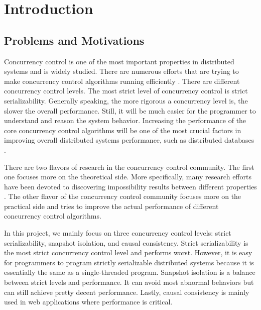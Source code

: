 \newcommand{\package}{\emph}

\chapter{Introduction}
\label{chap:introduction}
\section{Problems and Motivations}

Concurrency control is one of the most important properties in distributed systems and is widely studied. 
There are numerous efforts that are trying to make concurrency control algorithms running efficiently \cite{bernstein1981concurrency, du2013clock, liu2024noc, lu2016snow, thomasian1998concurrency, barghouti1991concurrency, harding2017evaluation, agrawal1987concurrency,lora,ua}. There are different concurrency control levels. The most strict level of concurrency control is strict serializability. Generally speaking, the more rigorous a concurrency level is, the slower the overall performance. Still, it will be much easier for the programmer to understand and reason the system behavior. Increasing the performance of the core concurrency control algorithms will be one of the most crucial factors in improving overall distributed systems performance, such as distributed databases \cite{harding2017evaluation, agrawal1987concurrency}.  


There are two flavors of research in the concurrency control community. The first one focuses more on the theoretical side. More specifically, many research efforts have been devoted to discovering impossibility results between different properties \cite{liu2024noc, lu2016snow}.  The other flavor of the concurrency control community focuses more on the practical side and tries to improve the actual performance of different concurrency control algorithms.


In this project, we mainly focus on three concurrency control levels: strict serializability, snapshot isolation, and causal consistency. Strict serializability is the most strict concurrency control level and performs worst. However, it is easy for programmers to program strictly serializable distributed systems because it is essentially the same as a single-threaded program.  Snapshot isolation is a balance between strict levels and performance. It can avoid most abnormal behaviors but can still achieve pretty decent performance. Lastly, causal consistency is mainly used in web applications where performance is critical.


